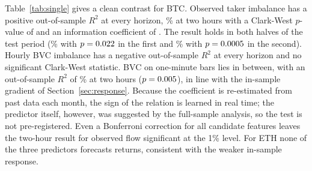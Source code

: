 \begin{table}[t]
\centering\caption{Single-predictor out-of-sample test}\label{tab:single}
\resizebox{\textwidth}{!}{}
\end{table}

Table~\ref{tab:single} gives a clean contrast for BTC. Observed taker imbalance has a positive
out-of-sample $R^2$ at every horizon, \BTCspRtwo\% at two hours with a Clark-West $p$-value of
\BTCspPtwo{} and an information coefficient of \BTCspICtwo. The result holds in both halves of the
test period (\BTCspRAtwo\% with $p=0.022$ in the first and \BTCspRBtwo\% with $p=0.0005$ in
the second). Hourly BVC imbalance has a negative out-of-sample $R^2$ at every horizon and no
significant Clark-West statistic. BVC on one-minute bars lies in between, with an out-of-sample $R^2$
of \BTCspbvcmRtwo\% at two hours ($p=0.005$), in line with the in-sample gradient of
Section~\ref{sec:response}. Because the coefficient is re-estimated from past data each month, the
sign of the relation is learned in real time; the predictor itself, however, was suggested by the
full-sample analysis, so the test is not pre-registered. Even a Bonferroni correction for all \nALL{}
candidate features leaves the two-hour result for observed flow significant at the 1\% level. For
ETH none of the three predictors forecasts returns, consistent with the weaker in-sample response.

\begin{table}[t]
\centering\caption{Trading on the single observed-flow forecast, two-hour holding period}\label{tab:single_trading}

\end{table}

